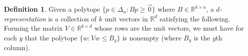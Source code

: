 \documentclass[12pt]{article}
\theoremstyle{definition}
\newtheorem{definition}{Definition}
\newcommand{\reals}{\mathbb{R}}
\begin{document}
\begin{definition}
  Given a polytope $\{p \in \Delta_n : B p \geq \vec{0}\}$ where $B \in \reals^{k \times n}$, a \emph{$d$-representation} is a collection of $k$ unit vectors in $\reals^d$ satisfying the following.
  Forming the matrix $V \in \reals^{k \times d}$ whose rows are the unit vectors, we must have for each $y$ that the polytope $\{ w : Vw \leq B_y \}$ is nonempty (where $B_y$ is the $y$th column).
\end{definition}

\end{document}
